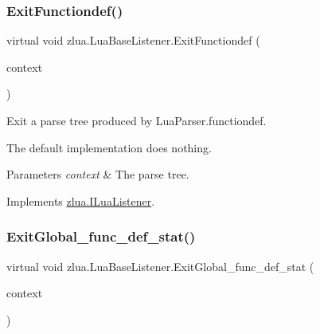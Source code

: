 \subsubsection{\texorpdfstring{Exit\+Functiondef()}{ExitFunctiondef()}}
{\footnotesize\ttfamily virtual void zlua.\+Lua\+Base\+Listener.\+Exit\+Functiondef (\begin{DoxyParamCaption}\item[{\mbox{[}\+Not\+Null\mbox{]} \mbox{\hyperlink{classzlua_1_1_lua_parser_1_1_functiondef_context}{Lua\+Parser.\+Functiondef\+Context}}}]{context }\end{DoxyParamCaption})\hspace{0.3cm}{\ttfamily [virtual]}}



Exit a parse tree produced by Lua\+Parser.\+functiondef. 

The default implementation does nothing.


\begin{DoxyParams}{Parameters}
{\em context} & The parse tree.\\
\hline
\end{DoxyParams}


Implements \mbox{\hyperlink{interfacezlua_1_1_i_lua_listener_a61203f381bc56ad4df13efd83138aeec}{zlua.\+I\+Lua\+Listener}}.

\mbox{\label{classzlua_1_1_lua_base_listener_afc42dc32e923011884d110d92eb7024b}} 
\subsubsection{\texorpdfstring{Exit\+Global\+\_\+func\+\_\+def\+\_\+stat()}{ExitGlobal\_func\_def\_stat()}}
{\footnotesize\ttfamily virtual void zlua.\+Lua\+Base\+Listener.\+Exit\+Global\+\_\+func\+\_\+def\+\_\+stat (\begin{DoxyParamCaption}\item[{\mbox{[}\+Not\+Null\mbox{]} \mbox{\hyperlink{classzlua_1_1_lua_parser_1_1_global__func__def__stat_context}{Lua\+Parser.\+Global\+\_\+func\+\_\+def\+\_\+stat\+Context}}}]{context }\end{DoxyParamCaption})\hspace{0.3cm}{\ttfamily [virtual]}}



